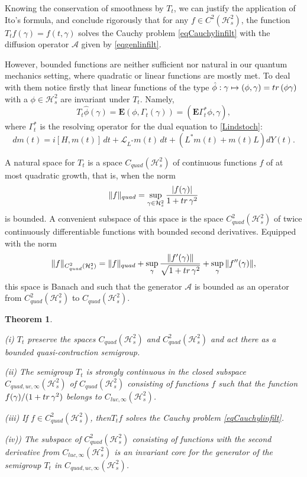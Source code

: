 \documentclass[10pt,a4paper]{amsart}
\def\AC{\mathcal{A}}
\def\LC{\mathcal{L}}
\def\HC{\mathcal{H}}
\def\E{\mathbf{E}}
\def\tr{\rm{tr}}
\def\ga{\gamma}
\newtheorem{theorem}{Theorem}[section]
\newcommand{\Ga}{\Gamma}
\begin{document}
Knowing the conservation of smoothness by $T_t$, we can justify the application of Ito's formula,
and conclude rigorously
that for any $f\in C^2(\HC^2_s)$,
the function $T_tf(\ga)=f(t,\ga)$ solves the Cauchy problem
\eqref{eqCauchylinfilt} with the diffusion operator $\AC$ given by
\eqref{eqgenlinfilt}.

However, bounded functions are neither sufficient nor natural in our quantum mechanics setting,
where quadratic or linear functions are mostly met. To deal with them notice firstly that
linear functions of the type $\hat \phi: \ga \mapsto (\phi, \ga)={\tr}\, (\phi \ga)$ with a $\phi \in \HC^2_s$
are invariant under $T_t$. Namely,
\[
T_t \hat \phi (\ga)=\E (\phi, \Ga_t(\ga))=(\E \Ga_t^* \phi, \ga),
\]
where $\Ga_t^*$ is the resolving operator for the dual equation to \eqref{Lindstoch}:
\begin{equation}
\label{Lindstochdu}
dm(t)=i[H,m(t)] \, dt +\LC_{L^*} m(t) \, dt +(L^* m(t)+ m(t) L) dY(t).
\end{equation}

A natural space for $T_t$ is a space $C_{quad}(\HC^2_s)$ of continuous functions $f$
of at most quadratic growth, that is, when the norm
\[
\|f\|_{quad}=\sup_{\ga \in \HC^2_s} \frac{|f(\ga)|}{1+{\tr} \, \ga^2}
\]
is bounded. A convenient subspace of this space is the space $C^2_{quad}(\HC^2_s)$
of twice continuously differentiable functions with bounded second derivatives.
Equipped with the norm
\[
\|f\|_{C^2_{quad}(\HC^2_s)}=\|f\|_{quad}+\sup_{\ga} \frac{\|f'(\ga)\|}{\sqrt{1+{\tr} \, \ga^2}}
+\sup_{\ga} \|f''(\ga)\|,
\]
this space is Banach and such that the generator $\AC$ is bounded as an operator
from $C^2_{quad}(\HC^2_s)$ to $C_{quad}(\HC^2_s)$.

\begin{theorem}
\label{Linsdesem1}

(i) $T_t$ preserve the spaces $C_{quad}(\HC^2_s)$ and $C^2_{quad}(\HC^2_s)$
and act there as a bounded quasi-contraction semigroup.

(ii) The semigroup $T_t$ is strongly continuous in the closed subspace $C_{quad,uc,\infty}(\HC^2_s)$
of $C_{quad}(\HC^2_s)$ consisting of functions $f$ such that the function $f(\ga)/(1+{\tr}\, \ga^2)$
belongs to  $C_{luc,\infty}(\HC^2_s)$.

(iii) If $f\in C^2_{quad}(\HC^2_s)$, then$T_tf$ solves the Cauchy problem \eqref{eqCauchylinfilt}.

(iv)) The subspace of $C_{quad}^2(\HC^2_s)$ consisting of functions with the second derivative from
$C_{luc,\infty}(\HC^2_s)$ is an invariant core for the generator of the semigroup $T_t$ in $C_{quad,uc,\infty}(\HC^2_s)$.
 \end{theorem}
\end{document}
